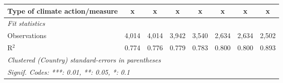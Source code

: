 \begin{table}[htbp]
\begin{tabular}{lccccccc}
      Type of climate action/measure                                   & x             & x            & x             & x            & x             & x             & x\\  
      \midrule \emph{Fit statistics}\\
      Observations                                                     & 4,014         & 4,014        & 3,942         & 3,540        & 2,634         & 2,634         & 2,502\\  
      R$^2$                                                            & 0.774         & 0.776        & 0.779         & 0.783        & 0.800         & 0.800         & 0.893\\  
      \midrule
      \multicolumn{8}{l}{\emph{Clustered (Country) standard-errors in parentheses}}\\
      \multicolumn{8}{l}{\emph{Signif. Codes: ***: 0.01, **: 0.05, *: 0.1}}\\
   \end{tabular}
\end{table}


